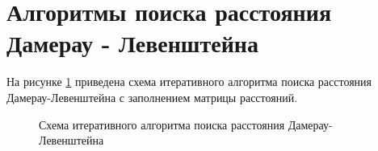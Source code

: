
\section{Алгоритмы поиска расстояния Дамерау - Левенштейна}
На рисунке \ref{fig:dleven_iter} приведена схема итеративного алгоритма поиска расстояния Дамерау-Левенштейна с заполнением матрицы расстояний.

\begin{figure}[h!]
	
		
	\caption{Схема итеративного алгоритма поиска расстояния Дамерау-Левенштейна}
		
	\label{fig:dleven_iter}
		
\end{figure}

